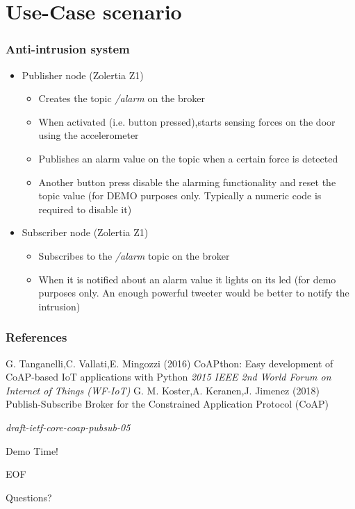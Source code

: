 \documentclass{beamer}
\begin{document}
\section{Use-Case scenario}
\begin{frame}
\frametitle{Anti-intrusion system} 
\begin{itemize}
  \item Publisher node (Zolertia Z1)\pause
  \begin{itemize}
    \item Creates the topic \textit{/alarm} on the broker\pause
    \item When activated (i.e. button pressed),starts sensing forces on the door using the accelerometer\pause
    \item Publishes an alarm value on the topic when a certain force is detected\pause
    \item Another button press disable the alarming functionality and reset the topic value (for DEMO purposes only. Typically a numeric code is required to disable it)
  \end{itemize}\pause

  \item Subscriber node (Zolertia Z1)\pause
  \begin{itemize}
    \item Subscribes to the \textit{/alarm} topic on the broker\pause
    \item When it is notified about an alarm value it lights on its led (for demo purposes only. An enough powerful tweeter would be better to notify the intrusion)
  \end{itemize}
\end{itemize}
\end{frame}



\begin{frame}
\frametitle{References}
\footnotesize{
\begin{thebibliography}{99} %
G. Tanganelli,C. Vallati,E. Mingozzi (2016)
\newblock CoAPthon: Easy development of CoAP-based IoT applications with Python
\newblock \emph{2015 IEEE 2nd World Forum on Internet of Things (WF-IoT)}
G. M. Koster,A. Keranen,J. Jimenez (2018)
\newblock Publish-Subscribe Broker for the Constrained Application Protocol (CoAP)

\newblock \emph{draft-ietf-core-coap-pubsub-05}
\end{thebibliography}
}
\end{frame}

\begin{frame}
\Huge{\centerline{Demo Time!}}
\end{frame}



\begin{frame}
\Huge{\centerline{EOF}\centerline{Questions?}}
\end{frame}

\end{document}
